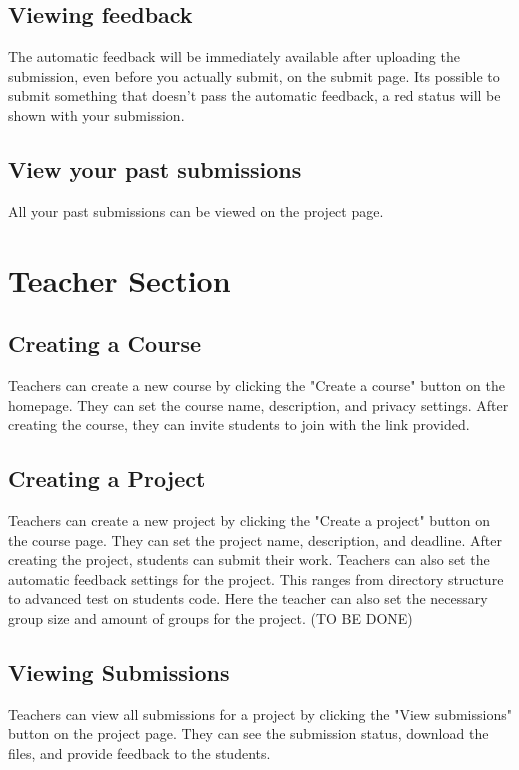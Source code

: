\documentclass{article}
\begin{document}
\subsection{Viewing feedback}
The automatic feedback will be immediately available after uploading the submission, even before you actually submit, on the submit page. Its possible to submit something that doesn't pass the automatic feedback, a red status will be shown with your submission.

\subsection{View your past submissions}
All your past submissions can be viewed on the project page.

\section{Teacher Section}

\subsection{Creating a Course}
Teachers can create a new course by clicking the "Create a course" button on the homepage. They can set the course name, description, and privacy settings. After creating the course, they can invite students to join with the link provided.

\subsection{Creating a Project}
Teachers can create a new project by clicking the "Create a project" button on the course page. They can set the project name, description, and deadline. After creating the project, students can submit their work.
Teachers can also set the automatic feedback settings for the project. This ranges from directory structure to advanced test on students code. 
Here the teacher can also set the necessary group size and amount of groups for the project.
(TO BE DONE)

\subsection{Viewing Submissions}
Teachers can view all submissions for a project by clicking the "View submissions" button on the project page. They can see the submission status, download the files, and provide feedback to the students.
\end{document}
